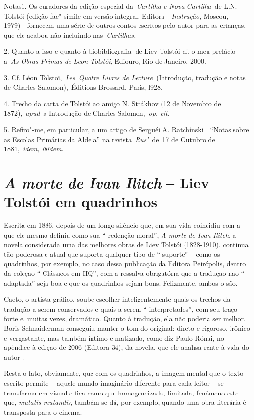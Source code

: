 Notas1. Os curadores da edição especial da~\emph{Cartilha e Nova
Cartilha~}de L.N. Tolstói (edição fac"-símile em versão integral,
Editora~~\emph{Instrução}, Moscou, 1979)~~fornecem uma série de outros
contos escritos pelo autor para as crianças, que ele acabou não
incluindo nas~\emph{Cartilhas.}

2. Quanto a isso e quanto à biobibliografia\textbf{~}de Liev Tolstói cf.
o meu prefácio a~\emph{As Obras Primas de Leon Tolstói}, Ediouro, Rio de
Janeiro, 2000.~

3. Cf. Léon Tolstoï,~\emph{Les}~\emph{Quatre Livres de
Lecture~}(Introdução, tradução e notas de Charles Salomon),~Éditions
Brossard, Paris, l928.

4. Trecho da carta de Tolstói ao amigo N. Strákhov (12 de Novembro de
1872),~\emph{apud}~a Introdução de Charles Salomon,~\emph{op. cit.}

5. Refiro"-me, em particular, a um artigo de Serguéi A.
Ratchínski~~``Notas sobre as Escolas Primárias da Aldeia'' na
revista~\emph{Rus'}~de~17 de Outubro de 1881,~\emph{idem, ibidem}.

\chapter{\emph{A morte de Ivan Ilitch} -- Liev Tolstói em quadrinhos}

Escrita em 1886, depois de um longo silêncio que, em sua vida coincidiu
com a que ele mesmo definiu como sua `` redenção moral'', \emph{A morte
de Ivan Ilitch}, a novela considerada uma das melhores obras de Liev
Tolstói (1828-1910), continua tão poderosa e atual que suporta qualquer
tipo de `` suporte'' -- como os quadrinhos, por exemplo, no caso dessa
publicação da Editora Peirópolis, dentro da coleção `` Clássicos em
HQ'', com a ressalva obrigatória que a tradução não `` adaptada'' seja
boa e que os quadrinhos sejam bons. Felizmente, ambos o são.

Caeto, o artista gráfico, soube escolher inteligentemente quais os
trechos da tradução a serem conservados e quais a serem ``
interpretados'', com seu traço forte e, muitas vezes, dramático. Quanto
à tradução, ela não poderia ser melhor. Boris Schnaiderman conseguiu
manter o tom do original: direto e rigoroso, irônico e vergastante, mas
também íntimo e matizado, como diz Paulo Rónai, no apêndice à edição de
2006 (Editora 34), da novela, que ele analisa rente à vida do autor .

Resta o fato, obviamente, que com os quadrinhos, a imagem mental que o
texto escrito permite -- aquele mundo imaginário diferente para cada
leitor -- se transforma em visual e fica como que homogeneizada,
limitada, fenômeno este que, \emph{mutatis mutandis}, também se dá, por
exemplo, quando uma obra literária é transposta para o cinema.

